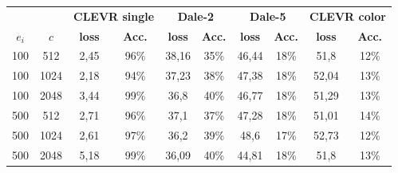 \begin{table}[ht]
    \centering
    \begin{tabular}{cc|cc|cc|cc|cc}
        \toprule
               &        & \multicolumn{2}{c}{\textbf{CLEVR single}} & \multicolumn{2}{c}{\textbf{Dale-2}} & \multicolumn{2}{c}{\textbf{Dale-5}} & \multicolumn{2}{c}{\textbf{CLEVR color}}                                                                 \\  \cmidrule(lr){3-4}\cmidrule(lr){5-6}\cmidrule(lr){7-8}\cmidrule(lr){9-10}
        $e_i$  & $c$    & \textbf{loss}                             & \textbf{Acc.}                       & \textbf{loss}                       & \textbf{Acc.}                            & \textbf{loss} & \textbf{Acc.} & \textbf{loss} & \textbf{Acc.} \\\midrule
        {100}  & {512}  & {2,45}                                    & {96\%}                              & {38,16}                             & {35\%}                                   & {46,44}       & {18\%}        & {51,8}        & {12\%}        \\
        {100}  & {1024} & {2,18}                                    & {94\%}                              & {37,23}                             & {38\%}                                   & {47,38}       & {18\%}        & {52,04}       & {13\%}        \\
        {100}  & {2048} & {3,44}                                    & {99\%}                              & {36,8}                              & {40\%}                                   & {46,77}       & {18\%}        & {51,29}       & {13\%}        \\
        {500}  & {512}  & {2,71}                                    & {96\%}                              & {37,1}                              & {37\%}                                   & {47,28}       & {18\%}        & {51,01}       & {14\%}        \\
        {500}  & {1024} & {2,61}                                    & {97\%}                              & {36,2}                              & {39\%}                                   & {48,6}        & {17\%}        & {52,73}       & {12\%}        \\
        {500}  & {2048} & {5,18}                                    & {99\%}                              & {36,09}                             & {40\%}                                   & {44,81}       & {18\%}        & {51,8}        & {13\%}        \\

\end{tabular}
\end{table}

